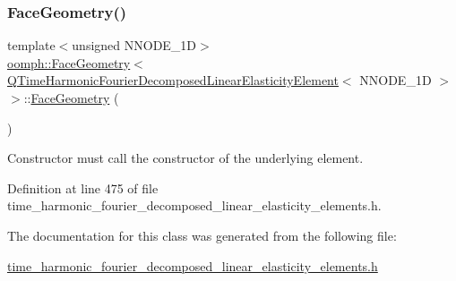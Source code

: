 \subsubsection{\texorpdfstring{Face\+Geometry()}{FaceGeometry()}}
{\footnotesize\ttfamily template$<$unsigned N\+N\+O\+D\+E\+\_\+1D$>$ \\
\hyperlink{classoomph_1_1FaceGeometry}{oomph\+::\+Face\+Geometry}$<$ \hyperlink{classoomph_1_1QTimeHarmonicFourierDecomposedLinearElasticityElement}{Q\+Time\+Harmonic\+Fourier\+Decomposed\+Linear\+Elasticity\+Element}$<$ N\+N\+O\+D\+E\+\_\+1D $>$ $>$\+::\hyperlink{classoomph_1_1FaceGeometry}{Face\+Geometry} (\begin{DoxyParamCaption}{ }\end{DoxyParamCaption})\hspace{0.3cm}{\ttfamily [inline]}}



Constructor must call the constructor of the underlying element. 



Definition at line 475 of file time\+\_\+harmonic\+\_\+fourier\+\_\+decomposed\+\_\+linear\+\_\+elasticity\+\_\+elements.\+h.



The documentation for this class was generated from the following file\+:\begin{DoxyCompactItemize}
\item 
\hyperlink{time__harmonic__fourier__decomposed__linear__elasticity__elements_8h}{time\+\_\+harmonic\+\_\+fourier\+\_\+decomposed\+\_\+linear\+\_\+elasticity\+\_\+elements.\+h}\end{DoxyCompactItemize}

